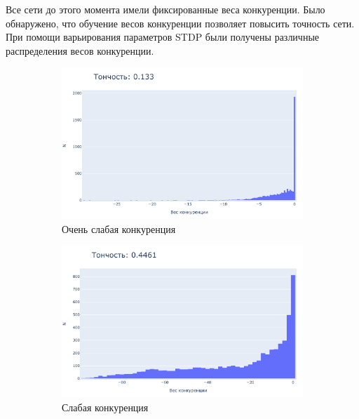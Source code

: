 \documentclass[a4paper]{article}
\begin{document}
Все сети до этого момента имели фиксированные веса конкуренции. Было обнаружено, что обучение весов конкуренции позволяет повысить точность сети. При помощи варьирования параметров STDP были получены различные распределения весов конкуренции.

\begin{figure}[H]
\centering
\begin{subfigure}{0.45\textwidth}
    \includegraphics[width=\textwidth,keepaspectratio=true]{competition_distribution_worst_ru.pdf}
    \caption{Очень слабая конкуренция}
\end{subfigure}
\begin{subfigure}{0.45\textwidth}
    \includegraphics[width=\textwidth,keepaspectratio=true]{competition_distribution_medium_bad_ru.pdf}
    \caption{Слабая конкуренция}
\end{subfigure}
\\
\begin{subfigure}{0.45\textwidth}

\end{subfigure}
\end{figure}
\end{document}
